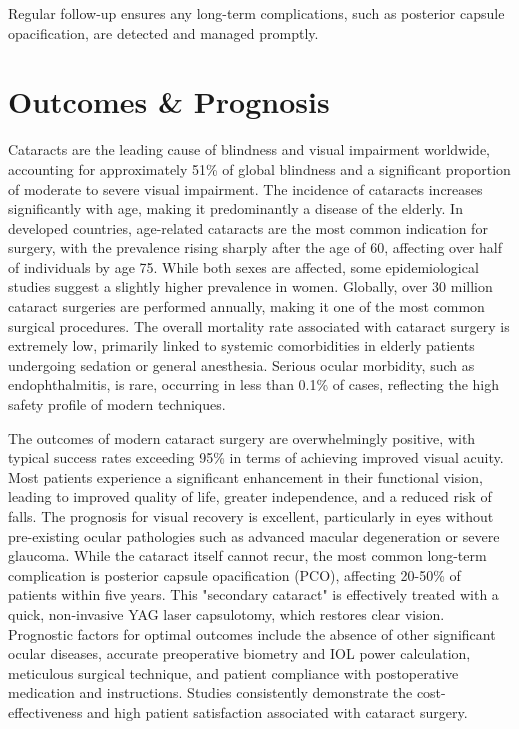 Regular follow-up ensures any long-term complications, such as posterior capsule opacification, are detected and managed promptly.

\section*{Outcomes \& Prognosis}
Cataracts are the leading cause of blindness and visual impairment worldwide, accounting for approximately 51\% of global blindness and a significant proportion of moderate to severe visual impairment. The incidence of cataracts increases significantly with age, making it predominantly a disease of the elderly. In developed countries, age-related cataracts are the most common indication for surgery, with the prevalence rising sharply after the age of 60, affecting over half of individuals by age 75. While both sexes are affected, some epidemiological studies suggest a slightly higher prevalence in women. Globally, over 30 million cataract surgeries are performed annually, making it one of the most common surgical procedures. The overall mortality rate associated with cataract surgery is extremely low, primarily linked to systemic comorbidities in elderly patients undergoing sedation or general anesthesia. Serious ocular morbidity, such as endophthalmitis, is rare, occurring in less than 0.1\% of cases, reflecting the high safety profile of modern techniques.

The outcomes of modern cataract surgery are overwhelmingly positive, with typical success rates exceeding 95\% in terms of achieving improved visual acuity. Most patients experience a significant enhancement in their functional vision, leading to improved quality of life, greater independence, and a reduced risk of falls. The prognosis for visual recovery is excellent, particularly in eyes without pre-existing ocular pathologies such as advanced macular degeneration or severe glaucoma. While the cataract itself cannot recur, the most common long-term complication is posterior capsule opacification (PCO), affecting 20-50\% of patients within five years. This "secondary cataract" is effectively treated with a quick, non-invasive YAG laser capsulotomy, which restores clear vision. Prognostic factors for optimal outcomes include the absence of other significant ocular diseases, accurate preoperative biometry and IOL power calculation, meticulous surgical technique, and patient compliance with postoperative medication and instructions. Studies consistently demonstrate the cost-effectiveness and high patient satisfaction associated with cataract surgery.

